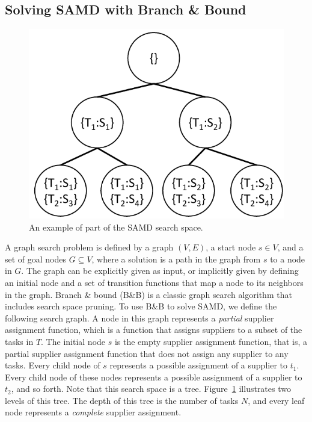 \documentclass[letterpaper]{article} %
\newcommand{\samd}{\ac{SAMD}\xspace}
\newcommand{\astar}{\textsc{A*}\xspace}
\newcommand{\bnb}{\textsc{B\&B}\xspace}
\begin{document}

\subsection{Solving \samd with Branch \& Bound}
\label{sec:graph}

\begin{figure}
    \centering
    \includegraphics[width=0.6\columnwidth]{search-space-samd_cropped.pdf}
    \caption{An example of part of the \samd search space.}
    \label{fig:search-space}
\end{figure}

A graph search problem is defined by a graph $(V,E)$, a start node $s\in V$, and a set of goal nodes $G\subseteq V$, where a solution is a path in the graph from $s$ to a node in $G$.  The graph can be explicitly given as input, or implicitly given by defining an initial node and a set of transition functions that map a node to its neighbors in the graph. 
Branch \& bound (\bnb) is a classic graph search algorithm that includes search space pruning. To use \bnb to solve \samd, we define the following search graph. A node in this graph represents a \emph{partial} supplier assignment function, which is a function that assigns suppliers to a subset of the tasks in $T$. 
The initial node $s$ is the empty supplier assignment function, that is, a partial supplier assignment function that does not assign any supplier to any tasks. 
Every child node of $s$ represents a possible assignment of a supplier to $t_1$. 
Every child node of these nodes represents a possible assignment of a supplier to $t_2$, 
and so forth. Note that this search space is a tree. Figure~\ref{fig:search-space} illustrates two levels of this tree. 
The depth of this tree is the number of tasks $N$, and every leaf node represents a \emph{complete} supplier assignment. 
\end{document}
